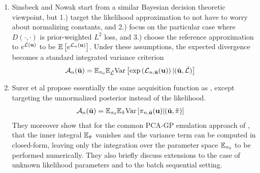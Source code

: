 \documentclass[12pt]{article}
\begin{document}
\begin{enumerate}
\item Sinsbeck and Nowak \cite{SinsbeckNowak} start from a similar Bayesian decision theoretic viewpoint, but 1.) target the likelihood approximation to not 
have to worry about normalizing constants, and 2.) focus on the particular case where $D(\cdot, \cdot)$ is prior-weighted $L^2$ loss, and 
3.) choose the reference approximation to $e^{\llik(\bpar)}$ to be $\E\left[e^{\indexDesign[\designIdx]{\llik}(\bpar)} \right]$. Under these assumptions, the 
expected divergence becomes a standard integrated variance criterion
\begin{align}
\acq[\designIdx](\tilde{\bpar}) &= \E_{\priorDens} \E_{\tilde{\llik}} \Var\left[\exp\left(\indexDesign[\designIdx, \tilde{\bpar}]{\llik}(\bpar)\right) | (\tilde{\bpar}, \tilde{\llik}) \right]
\end{align}

\item Surer et al \cite{Surer2023sequential} propose essentially the same acquisition function as \cite{SinsbeckNowak}, except targeting the 
unnormalized posterior instead of the likelihood.
\begin{align}
\acq[\designIdx](\tilde{\bpar}) &= \E_{\priorDens} \E_{\tilde{\postDens}} \Var\left[\indexDesign[\designIdx, \tilde{\bpar}]{\postDens}(\bpar) | (\tilde{\bpar}, \tilde{\postDens}) \right]
\end{align}
They moreover show that for the common PCA-GP emulation approach of \cite{Higdon}, that the inner integral $\E_{\tilde{\postDens}}$ vanishes and the variance term can 
be computed in closed-form, leaving only the integration over the parameter space $\E_{\priorDens}$ to be performed numerically. They also briefly discuss extensions to 
the case of unknown likelihood parameters and to the batch sequential setting. 


\end{enumerate}
\end{document}
